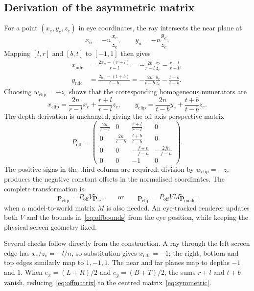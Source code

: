 \documentclass[11pt,a4paper]{article}
\newcommand{\vect}[1]{\boldsymbol{#1}}
\newcommand{\ndc}{\mathrm{ndc}}
\newcommand{\clip}{\mathrm{clip}}
\numberwithin{equation}{section}
\begin{document}
\subsection{Derivation of the asymmetric matrix}
For a point $(x_e,y_e,z_e)$ in eye coordinates, the ray intersects the near plane at
\begin{equation}
x_n=-n\frac{x_e}{z_e},\qquad y_n=-n\frac{y_e}{z_e}.
\end{equation}
Mapping $[l,r]$ and $[b,t]$ to $[-1,1]$ then gives
\begin{align}
x_{\ndc}&=\frac{2x_n-(r+l)}{r-l}
=-\frac{2n}{r-l}\frac{x_e}{z_e}-\frac{r+l}{r-l},\\
y_{\ndc}&=\frac{2y_n-(t+b)}{t-b}
=-\frac{2n}{t-b}\frac{y_e}{z_e}-\frac{t+b}{t-b}.
\end{align}
Choosing $w_{\clip}=-z_e$ shows that the corresponding homogeneous numerators are
\begin{equation}
x_{\clip}=\frac{2n}{r-l}x_e+\frac{r+l}{r-l}z_e,\qquad
y_{\clip}=\frac{2n}{t-b}y_e+\frac{t+b}{t-b}z_e.
\end{equation}
The depth derivation is unchanged, giving the off-axis perspective matrix
\begin{equation}\label{eq:offmatrix}
\boxed{P_{\mathrm{off}}=\begin{pmatrix}
\frac{2n}{r-l}&0&\frac{r+l}{r-l}&0\\
0&\frac{2n}{t-b}&\frac{t+b}{t-b}&0\\
0&0&-\frac{f+n}{f-n}&-\frac{2fn}{f-n}\\
0&0&-1&0
\end{pmatrix}.}
\end{equation}
The positive signs in the third column are required: division by $w_{\clip}=-z_e$ produces the negative constant offsets in the normalised coordinates. The complete transformation is
\begin{equation}
\vect p_{\clip}=P_{\mathrm{off}}V\widetilde{\vect p}_w,
\qquad\text{or}\qquad
\vect p_{\clip}=P_{\mathrm{off}}VM\widetilde{\vect p}_{\mathrm{model}}
\end{equation}
when a model-to-world matrix $M$ is also needed. An eye-tracked renderer updates both $V$ and the bounds in~\eqref{eq:offbounds} from the eye position, while keeping the physical screen geometry fixed.

Several checks follow directly from the construction. A ray through the left screen edge has $x_e/z_e=-l/n$, so substitution gives $x_{\ndc}=-1$; the right, bottom and top edges similarly map to $1,-1,1$. The near and far planes map to depths $-1$ and $1$. When $e_x=(L+R)/2$ and $e_y=(B+T)/2$, the sums $r+l$ and $t+b$ vanish, reducing~\eqref{eq:offmatrix} to the centred matrix~\eqref{eq:symmetric}.
\end{document}
